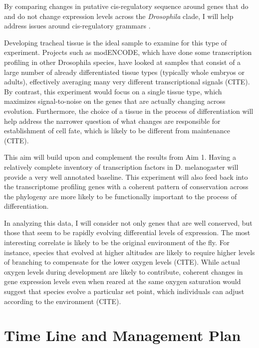 \documentclass{proposal}
\begin{document}
By comparing changes in putative cis-regulatory sequence around genes that do and do not change expression levels across the {\em Drosophila} clade, I will help address issues around cis-regulatory grammars \cite{Papatsenko:2009de, Hare:2008fi}. 



Developing tracheal tissue is the ideal sample to examine for this type of experiment.
Projects such as modENCODE, which have done some transcription profiling in other Drosophila species, have looked at samples that consist of a large number of already differentiated tissue types (typically whole embryos or adults), effectively averaging many very different transcriptional signals (CITE).
By contrast, this experiment would focus on a single tissue type, which maximizes signal-to-noise on the genes that are actually changing across evolution.
Furthermore, the choice of a tissue in the process of differentiation will help address the narrower question of what changes are responsible for establishment of cell fate, which is likely to be different from maintenance (CITE). 

This aim will build upon and complement the results from Aim 1.
Having a relatively complete inventory of transcription factors in D.  melanogaster will provide a very well annotated baseline.
This experiment will also feed back into the transcriptome profiling genes with a coherent pattern of conservation across the phylogeny are more likely to be functionally important to the process of differentiation.

In analyzing this data, I will consider not only genes that are well conserved, but those that seem to be rapidly evolving differential levels of expression.
The most interesting correlate is likely to be the original environment of the fly.
For instance, species that evolved at higher altitudes are likely to require higher levels of branching to compensate for the lower oxygen levels (CITE).
While actual oxygen levels during development are likely to contribute, coherent changes in gene expression levels even when reared at the same oxygen saturation would suggest that species evolve a particular set point, which individuals can adjust according to the environment (CITE).



\section{Time Line and Management Plan}
\end{document}

